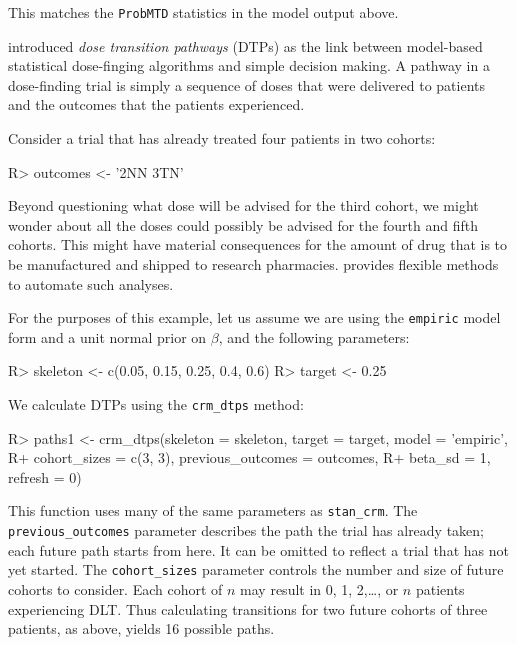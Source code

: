 \documentclass[article]{jss}
\begin{document}
This matches the \texttt{ProbMTD} statistics in the model output above.

\citet{Yap2017} introduced \textit{dose transition pathways} (DTPs) as
the link between model-based statistical dose-finging algorithms and
simple decision making. A pathway in a dose-finding trial is simply a
sequence of doses that were delivered to patients and the outcomes that
the patients experienced.

Consider a trial that has already treated four patients in two cohorts:

\begin{CodeChunk}

\begin{CodeInput}
R> outcomes <- '2NN 3TN'
\end{CodeInput}
\end{CodeChunk}

Beyond questioning what dose will be advised for the third cohort, we
might wonder about all the doses could possibly be advised for the
fourth and fifth cohorts. This might have material consequences for the
amount of drug that is to be manufactured and shipped to research
pharmacies.  provides flexible methods to automate such
analyses.

For the purposes of this example, let us assume we are using the
\texttt{empiric} model form and a unit normal prior on \(\beta\), and
the following parameters:

\begin{CodeChunk}

\begin{CodeInput}
R> skeleton <- c(0.05, 0.15, 0.25, 0.4, 0.6)
R> target <- 0.25
\end{CodeInput}
\end{CodeChunk}

We calculate DTPs using the \texttt{crm\_dtps} method:

\begin{CodeChunk}

\begin{CodeInput}
R> paths1 <- crm_dtps(skeleton = skeleton, target = target, model = 'empiric', 
R+                    cohort_sizes = c(3, 3), previous_outcomes = outcomes,
R+                    beta_sd = 1, refresh = 0)
\end{CodeInput}
\end{CodeChunk}

This function uses many of the same parameters as \texttt{stan\_crm}.
The \texttt{previous\_outcomes} parameter describes the path the trial
has already taken; each future path starts from here. It can be omitted
to reflect a trial that has not yet started. The \texttt{cohort\_sizes}
parameter controls the number and size of future cohorts to consider.
Each cohort of \(n\) may result in 0, 1, 2,\ldots{}, or \(n\) patients
experiencing DLT. Thus calculating transitions for two future cohorts of
three patients, as above, yields 16 possible paths.
\end{document}
